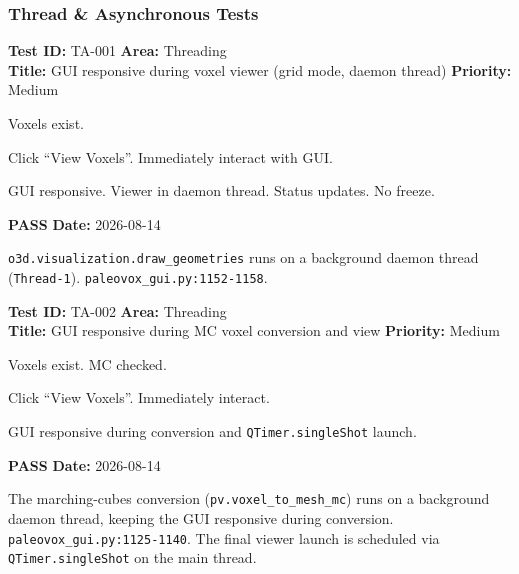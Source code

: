 \documentclass[12pt,a4paper]{article}
\newcommand{\pass}{\textcolor{paleogreen}{\textbf{PASS}}}
\newcommand{\testheader}[4]{%
  \smallskip
  \noindent\textbf{Test ID:} #1 \hfill \textbf{Area:} #2 \\
  \textbf{Title:} #3 \hfill \textbf{Priority:} #4
}
\newenvironment{testbody}{%
  \begin{description}[leftmargin=2em,style=nextline]
}{%
  \end{description}
  \smallskip
}
\begin{document}
\subsubsection{Thread \& Asynchronous Tests}

\testheader{TA-001}{Threading}{GUI responsive during voxel viewer (grid mode, daemon thread)}{Medium}
\begin{testbody}
  \item[\textbf{Preconditions:}] Voxels exist.
  \item[\textbf{Steps:}] Click ``View Voxels''. Immediately interact with GUI.
  \item[\textbf{Expected Result:}] GUI responsive. Viewer in daemon thread.
        Status updates. No freeze.
  \item[\textbf{Status:}] \pass{} \hspace{1em} \textbf{Date:} 2026-08-14
  \item[\textbf{Notes:}] \texttt{o3d.visualization.draw\_geometries} runs on a
        background daemon thread (\texttt{Thread-1}).
        \texttt{paleovox\_gui.py:1152-1158}.
\end{testbody}

\testheader{TA-002}{Threading}{GUI responsive during MC voxel conversion and view}{Medium}
\begin{testbody}
  \item[\textbf{Preconditions:}] Voxels exist. MC checked.
  \item[\textbf{Steps:}] Click ``View Voxels''. Immediately interact.
  \item[\textbf{Expected Result:}] GUI responsive during conversion and
        \texttt{QTimer.singleShot} launch.
  \item[\textbf{Status:}] \pass{} \hspace{1em} \textbf{Date:} 2026-08-14
  \item[\textbf{Notes:}] The marching-cubes conversion
        (\texttt{pv.voxel\_to\_mesh\_mc}) runs on a background daemon thread,
        keeping the GUI responsive during conversion.
        \texttt{paleovox\_gui.py:1125-1140}. The final viewer launch is
        scheduled via \texttt{QTimer.singleShot} on the main thread.
\end{testbody}
\end{document}
